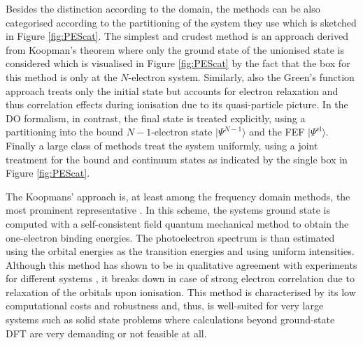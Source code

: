 
Besides the distinction according to the domain, the methods can be also categorised according to the partitioning of the system they use which is sketched in Figure \ref{fig:PEScat}.
The simplest and crudest method is an approach derived from Koopman's theorem where only the ground state of the un\-ion\-ised state is considered which is visualised in Figure \ref{fig:PEScat} by the fact that the box for this method is only at the $N$-electron system.
Similarly, also the Green's function approach treats only the initial state but accounts for electron relaxation and thus correlation effects during ionisation due to its quasi-particle picture.
In the DO formalism, in contrast, the final state is treated explicitly, using a partitioning into the bound $N-1$-electron state $|\Psi^{N-1}\rangle$ and the FEF $|\Psi^\text{el}\rangle$.
Finally a large class of methods treat the system uniformly, using a joint treatment for the bound and continuum states as indicated by the single box in Figure \ref{fig:PEScat}.

The Koopmans' approach is, at least among the frequency domain methods, the most prominent representative \cite{Koerzd1,PottsHolland,dos,dos2}.
In this scheme, the systems ground state is computed with a self-consistent field quantum mechanical method to obtain the one-electron binding energies.
The photoelectron spectrum is than estimated using the orbital energies as the transition energies and using uniform intensities.
Although this method has shown to be in qualitative agreement with experiments for different systems \cite{Koerzd1,Koerzd2, EggerKronik,PottsHolland,YepesJaque}, it breaks down in case of strong electron correlation \cite{2phcederbaum,2phcederbaum2} due to relaxation of the orbitals upon ionisation.
This method is characterised by its low computational costs and robustness and, thus, is well-suited for very large systems such as solid state problems where calculations beyond ground-state DFT are very demanding or not feasible at all.

